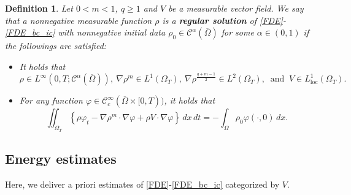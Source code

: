 \documentclass{amsart}
\newtheorem{defn}{Definition}[section]
\numberwithin{equation}{section}
\newcommand{\calC}{{ \mathcal C  }}
\DeclareMathOperator{\loc}{loc}
\begin{document}
\begin{defn}\label{D:regular-sol}
Let $0< m < 1$, $q\geq 1$ and $V$ be a measurable vector field.
We say that a nonnegative measurable function $\rho$ is
a \textbf{regular solution} of \eqref{FDE}-\eqref{FDE_bc_ic} with nonnegative initial data $\rho_0 \in \calC^{\alpha}(\overline{\Omega})$ for some $\alpha \in (0,1)$ if the followings are satisfied:
\begin{itemize}
\item[(i)] It holds that
\[
\rho \in L^{\infty}(0,T;\mathcal{C}^{\alpha}(\overline{\Omega})), 
\ \nabla \rho^m \in L^1(\Omega_T), 
\ \nabla \rho^{\frac{q+m-1}{2}} \in L^{2} (\Omega_T),
\ \text{ and } \ V \in L^{1}_{\loc}(\Omega_{T}).
\]
\item[(ii)] For any function $\varphi \in {\mathcal{C}}^\infty_c (\overline{\Omega} \times [0,T))$, it holds that 
\[
\iint_{\Omega_{T}} \left\{  \rho \varphi_t - \nabla \rho^m \cdot  \nabla \varphi + \rho V\cdot \nabla \varphi \right\} \,dx\,dt = -\int_{\Omega} \rho_{0} \varphi(\cdot, 0) \,dx.
\]
\end{itemize}
\end{defn}



\subsection{Energy estimates}

Here, we deliver a priori estimates of \eqref{FDE}-\eqref{FDE_bc_ic} categorized by $V$. 
\end{document}
